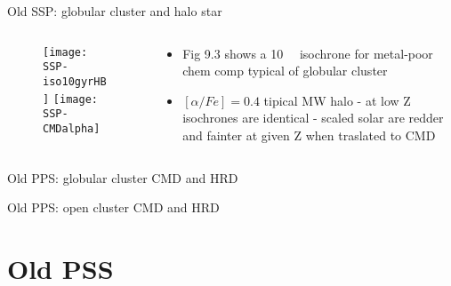 \begin{frame}{Old SSP: globular cluster and halo star}
\begin{columns}[T]
\begin{column}{0.4\textwidth}
		\begin{figure}[!ht]
		\texttt{[image: SSP-iso10gyrHB]}\label{fig:SSP-iso10gyrHB}
		\texttt{[image: SSP-CMDalpha]}\label{fig:SSP-CMDalpha}
		\end{figure}
\end{column}
\begin{column}{0.6\textwidth}
		\begin{itemize}
		\item Fig 9.3 shows a \SI{10}{\giga\year} isochrone for metal-poor chem comp typical of globular cluster
		\item $[\alpha/Fe]=0.4$ tipical MW halo - at low Z isochrones are identical - scaled solar are redder and fainter at given Z when traslated to CMD
		\end{itemize}
\end{column}
\end{columns}
\end{frame}

\begin{frame}{Old PPS: globular cluster}
CMD and HRD
\end{frame}

\begin{frame}{Old PPS: open cluster}
CMD and HRD
\end{frame}

\section{Old PSS}

